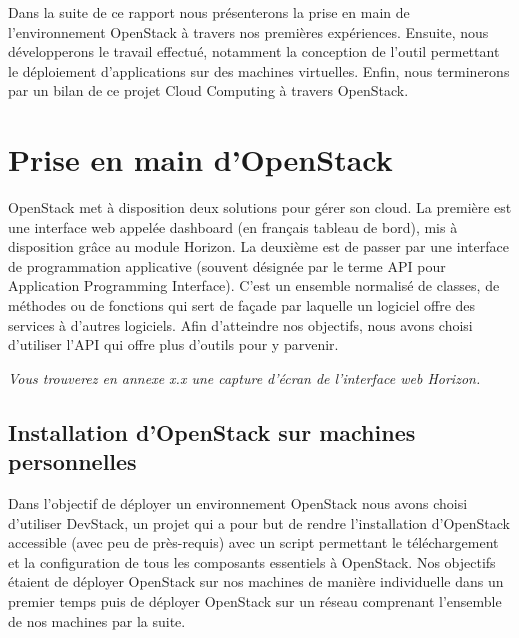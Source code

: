\documentclass{report}
\begin{document}
        Dans la suite de ce rapport nous présenterons la prise en main de l'environnement OpenStack à travers nos premières expériences. Ensuite, nous développerons le travail effectué, notamment la conception de l'outil permettant le déploiement d'applications sur des machines virtuelles. Enfin, nous terminerons par un bilan de ce projet Cloud Computing à travers OpenStack.

    
\newpage
\chapter{Prise en main d'OpenStack}

       OpenStack met à disposition deux solutions pour gérer son cloud. La première est une interface web appelée dashboard (en français tableau de bord), mis à disposition grâce au module Horizon. La deuxième est de passer par une interface de programmation applicative (souvent désignée par le terme API pour Application Programming Interface). C'est un ensemble normalisé de classes, de méthodes ou de fonctions qui sert de façade par laquelle un logiciel offre des services à d'autres logiciels. Afin d'atteindre nos objectifs, nous avons choisi d'utiliser l'API qui offre plus d'outils pour y parvenir.\bigbreak
       
      \textit{Vous trouverez en annexe x.x une capture d'écran de l'interface web Horizon.}
       
    \section{Installation d'OpenStack sur machines personnelles}

    Dans l'objectif de déployer un environnement OpenStack nous avons choisi d'utiliser DevStack, un projet qui a pour but de rendre l'installation d'OpenStack accessible (avec peu de près-requis) avec un script permettant le téléchargement et la configuration de tous les composants essentiels à OpenStack.\cite{DevStack}\newline
    Nos objectifs étaient de déployer OpenStack sur nos machines de manière individuelle dans un premier temps puis de déployer OpenStack sur un réseau comprenant l'ensemble de nos machines par la suite.
    \bigbreak
    
\end{document}

